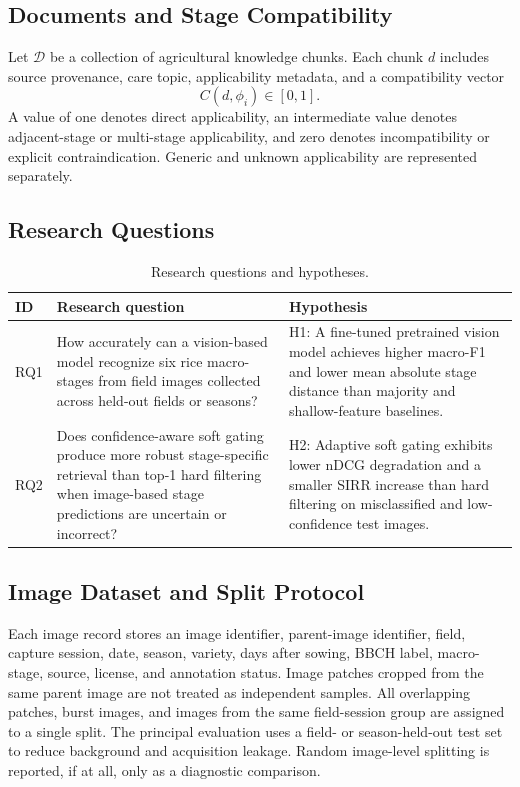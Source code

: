 \documentclass[conference]{IEEEtran}
\begin{document}
\subsection{Documents and Stage Compatibility}
Let $\mathcal{D}$ be a collection of agricultural knowledge chunks. Each chunk $d$ includes source provenance, care topic, applicability metadata, and a compatibility vector
\begin{equation}
C(d,\phi_i)\in[0,1].
\end{equation}
A value of one denotes direct applicability, an intermediate value denotes adjacent-stage or multi-stage applicability, and zero denotes incompatibility or explicit contraindication. Generic and unknown applicability are represented separately.

\subsection{Research Questions}
\begin{table}[t]
\caption{Research questions and hypotheses.}
\label{tab:rqs-image}
\centering
\footnotesize
\begin{tabular}{p{}p{}p{}}
\toprule
ID & Research question & Hypothesis \\
\midrule
RQ1 & How accurately can a vision-based model recognize six rice macro-stages from field images collected across held-out fields or seasons? & H1: A fine-tuned pretrained vision model achieves higher macro-F1 and lower mean absolute stage distance than majority and shallow-feature baselines. \\
RQ2 & Does confidence-aware soft gating produce more robust stage-specific retrieval than top-1 hard filtering when image-based stage predictions are uncertain or incorrect? & H2: Adaptive soft gating exhibits lower nDCG degradation and a smaller SIRR increase than hard filtering on misclassified and low-confidence test images. \\
\bottomrule
\end{tabular}
\end{table}

\subsection{Image Dataset and Split Protocol}
Each image record stores an image identifier, parent-image identifier, field, capture session, date, season, variety, days after sowing, BBCH label, macro-stage, source, license, and annotation status. Image patches cropped from the same parent image are not treated as independent samples. All overlapping patches, burst images, and images from the same field-session group are assigned to a single split. The principal evaluation uses a field- or season-held-out test set to reduce background and acquisition leakage. Random image-level splitting is reported, if at all, only as a diagnostic comparison.
\end{document}
